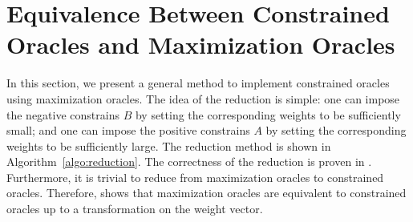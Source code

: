 \documentclass{article}
\newcommand{\junk}[1]{}
\newcommand{\M}{\mathcal M}
\newcommand{\B}{\mathcal B}
\DeclareMathOperator{\rank}{width}
\DeclareMathOperator{\Exchange}{Exchange}
\newcommand{\MultiIdent}{\textsc{TopK}\xspace}
\newcommand{\MultiBandit}{\textsc{MB}\xspace}
\newcommand{\Matroid}{\textsc{Matroid}\xspace}
\newcommand{\Match}{\textsc{Match}\xspace}
\newcommand{\Path}{\textsc{Path}\xspace}
\begin{document}
\junk{
\begin{fact} 
Let $\M\subseteq 2^{[n]}$ be one of our example types of decision classes. 
Then we can construct the exchange class for $\M$ and upper bound $\rank(\M)$ as follows.
\begin{itemize}
\item Define $\B_{\Matroid(n)}=\big\{(\{i\},\{j\})\mid\forall i\in [n], j\in [n]\big\}$. If $\M=\M_{\Matroid(T,\sigma)}$, then we have $\B_{\Matroid(n)} \in \Exchange(\M)$ and $\rank(\M) \le 2$.	  
\item Define $\B_{\Match(G,\sigma)}=\big\{(C_+,C_-)\mid \sigma^{-1}(C_+\cup C_-) \text{ is a cycle of }G\big\}$. If $\M=\M_{\Match(G,\sigma)}$, then we have $\B_{\Match(G)} \in \Exchange(\M)$ and $\rank(\M) \le |V|$.	  
\item Define 
$\B_{\Path(G,\sigma)}=\big\{ (P_1, P_2)\mid\sigma^{-1}(P_1)\text{ and }\sigma^{-1}(P_2)\text{ are two disjoint paths of }G\text{ with same endpoints}\big\}$. 
If $\M=\M_{\Path(G,s,t,\sigma)}$, then we have $\B_{\Path(G,\sigma)} \in \Exchange(\M)$ and $\rank(\M) \le |V|$.	  
\end{itemize}
Moreover, since \Matroid encompasses both \MultiIdent and \MultiBandit types of decision classes, we see that $\rank(\M) \le 2$ for decision classes $\M$ of these types.
\label{lemma:example-exchange-class}
\end{fact}
}


\section{Equivalence Between Constrained Oracles and Maximization Oracles}
\label{section:equivalence-constrained-oracle}

In this section, we present a general method to implement constrained oracles using maximization oracles.
The idea of the reduction is simple: one can impose the negative constrains $B$ by setting the corresponding weights to be sufficiently small; and one can impose the positive constrains $A$ by setting the corresponding weights to be sufficiently large.
The reduction method is shown in Algorithm~\ref{algo:reduction}.
The correctness of the reduction is proven in .
Furthermore, it is trivial to reduce from maximization oracles to constrained oracles. 
Therefore,  shows that maximization oracles are equivalent to constrained oracles up to a transformation on the weight vector. 
\end{document}
